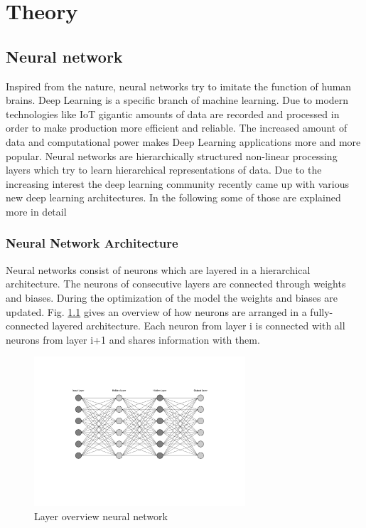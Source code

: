 \chapter{Theory}\label{chapter:theory}

\section{Neural network}

Inspired from the nature, neural networks try to imitate the function of human brains. Deep Learning is a specific branch of machine learning. Due to modern technologies like IoT gigantic amounts of data are recorded and processed in order to make production more efficient and reliable. The increased amount of data and computational power makes Deep Learning applications more and more popular. Neural networks are hierarchically structured non-linear processing layers which try to learn hierarchical representations of data. Due to the increasing interest the deep learning community recently came up with various new deep learning architectures. In the following some of those are explained more in detail

\subsection{Neural Network Architecture}
Neural networks consist of neurons which are layered in a hierarchical architecture. The neurons of consecutive layers are connected through weights and biases. During the optimization of the model the weights and biases are updated. Fig. \ref{fig:neural_network_overview} gives an overview of how neurons are arranged in a fully-connected layered architecture. Each neuron from layer i is connected with all neurons from layer i+1 and shares information with them.

\begin{figure}[htpb]
  \centering
  \includegraphics[width=0.7\textwidth, angle =-90]{neural_network_overview.pdf}
  \caption {Layer overview neural network}
  \label{fig:neural_network_overview}
\end{figure}

